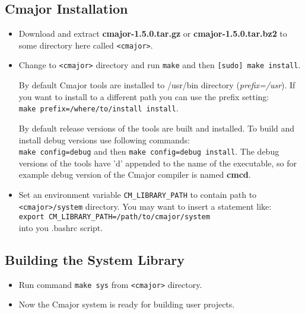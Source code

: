 \documentclass[oneside, a4paper, 11pt]{article}
\begin{document}
\subsection{Cmajor Installation}

\begin{itemize}

\item
Download and extract \textbf{cmajor-1.5.0.tar.gz} or \textbf{cmajor-1.5.0.tar.bz2}
to some directory here called \verb|<cmajor>|.

\item
Change to \verb|<cmajor>| directory and run \verb|make| and then \verb|[sudo] make install|.

By default Cmajor tools are installed to /usr/bin directory (\emph{prefix=/usr}).
If you want to install to a different path you can use the prefix setting:\\
\verb|make prefix=/where/to/install install|.

By default release versions of the tools are built and installed.
To build and install debug versions use following commands:\\
\verb|make config=debug| and then \verb|make config=debug install|.
The debug versions of the tools have 'd' appended to the name of the executable, so
for example debug version of the Cmajor compiler is named \textbf{cmcd}.

\item
Set an environment variable \verb|CM_LIBRARY_PATH| to contain path to \verb|<cmajor>/system| directory.
You may want to insert a statement like:\\
\verb|export CM_LIBRARY_PATH=/path/to/cmajor/system|\\
into you .bashrc script.

\end{itemize}

\subsection{Building the System Library}

\begin{itemize}

\item
Run command \verb|make sys| from \verb|<cmajor>| directory.

\item
Now the Cmajor system is ready for building user projects.

\end{itemize}
\end{document}
